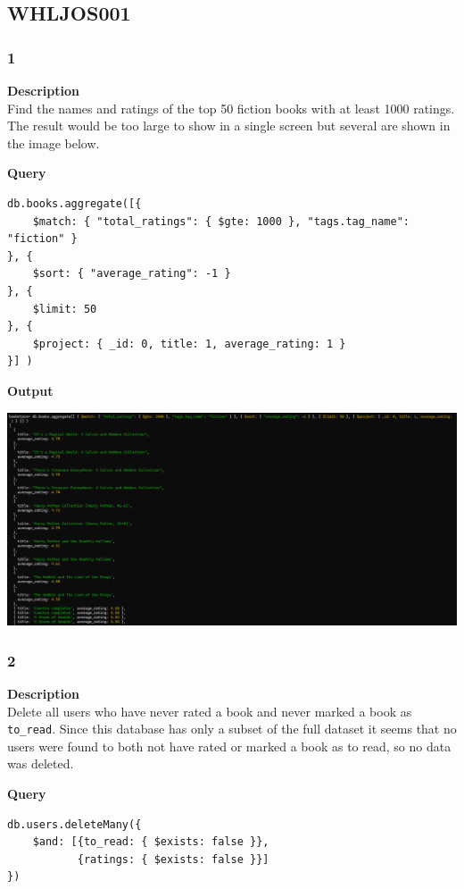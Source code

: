 \documentclass[11pt]{article}
\begin{document}
\subsection{WHLJOS001}
\label{sec:org51bf95d}
\subsubsection{1}
\label{sec:orgbfb20df}
\textbf{Description}\\
Find the names and ratings of the top 50 fiction books with at least 1000 ratings. The result would be too large to show in a single screen but several are shown in the image below.

\linebreak
\textbf{Query}
\begin{verbatim}
db.books.aggregate([{
    $match: { "total_ratings": { $gte: 1000 }, "tags.tag_name": "fiction" }
}, {
    $sort: { "average_rating": -1 }
}, {
    $limit: 50
}, {
    $project: { _id: 0, title: 1, average_rating: 1 }
}] )
\end{verbatim}
\linebreak
\textbf{Output}\\
\begin{center}
\includegraphics[width=1\textwidth]{images/WHLJOS001/1.png}
\end{center}
\pagebreak
\subsubsection{2}
\label{sec:orgb6a9edb}
\textbf{Description}\\
Delete all users who have never rated a book and never marked a book as \texttt{to\_read}. Since this database has only a subset of the full dataset it seems that no users were found to both not have rated or marked a book as to read, so no data was deleted.

\linebreak
\textbf{Query}
\begin{verbatim}
db.users.deleteMany({
    $and: [{to_read: { $exists: false }},
           {ratings: { $exists: false }}]
})
\end{verbatim}
\end{document}

